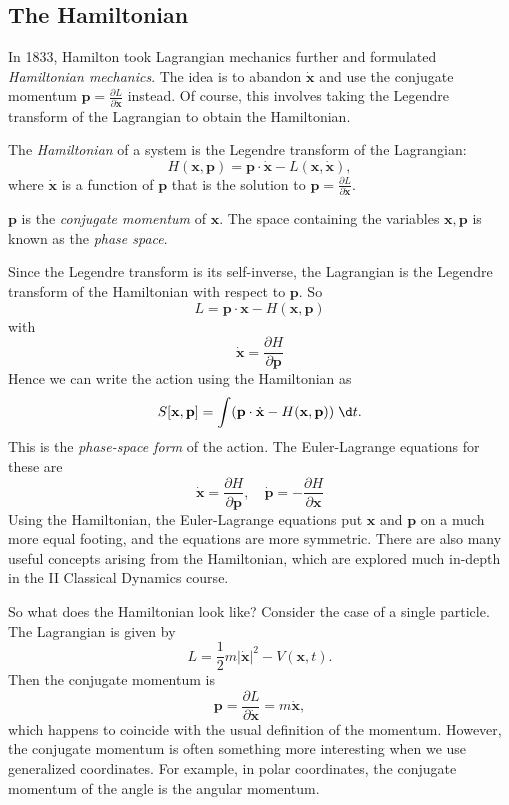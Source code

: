 \documentclass[a4paper]{article}
\begin{document}
\subsection{The Hamiltonian}
In 1833, Hamilton took Lagrangian mechanics further and formulated \emph{Hamiltonian mechanics}. The idea is to abandon $\dot{\mathbf{x}}$ and use the conjugate momentum $\mathbf{p} = \frac{\partial L}{\partial \dot{\mathbf{x}}}$ instead. Of course, this involves taking the Legendre transform of the Lagrangian to obtain the Hamiltonian.

\begin{defi}[Hamiltonian]
  The \emph{Hamiltonian} of a system is the Legendre transform of the Lagrangian:
  \[
    H(\mathbf{x}, \mathbf{p}) = \mathbf{p}\cdot \dot{\mathbf{x}} - L(\mathbf{x}, \dot{\mathbf{x}}),
  \]
  where $\dot{\mathbf{x}}$ is a function of $\mathbf{p}$ that is the solution to $\mathbf{p} = \frac{\partial L}{\partial \dot{\mathbf{x}}}$.

  $\mathbf{p}$ is the \emph{conjugate momentum} of $\mathbf{x}$. The space containing the variables $\mathbf{x}, \mathbf{p}$ is known as the \emph{phase space}.
\end{defi}

Since the Legendre transform is its self-inverse, the Lagrangian is the Legendre transform of the Hamiltonian with respect to $\mathbf{p}$. So
\[
  L = \mathbf{p}\cdot \mathbf{x} - H(\mathbf{x}, \mathbf{p})
\]
with
\[
  \dot{\mathbf{x}} = \frac{\partial H}{\partial \mathbf{p}}
\]
Hence we can write the action using the Hamiltonian as
\[
  S[\mathbf{x}, \mathbf{p}] = \int (\mathbf{p}\cdot \dot{\mathbf{x}} - H(\mathbf{x}, \mathbf{p}))\;\d t.
\]
This is the \emph{phase-space form} of the action. The Euler-Lagrange equations for these are
\[
  \dot{\mathbf{x}} = \frac{\partial H}{\partial \mathbf{p}}, \quad \dot{\mathbf{p}} = -\frac{\partial H}{\partial \mathbf{x}}
\]
Using the Hamiltonian, the Euler-Lagrange equations put $\mathbf{x}$ and $\mathbf{p}$ on a much more equal footing, and the equations are more symmetric. There are also many useful concepts arising from the Hamiltonian, which are explored much in-depth in the II Classical Dynamics course.

So what does the Hamiltonian look like? Consider the case of a single particle. The Lagrangian is given by
\[
  L = \frac{1}{2}m|\dot{\mathbf{x}}|^2 - V(\mathbf{x}, t).
\]
Then the conjugate momentum is
\[
  \mathbf{p} = \frac{\partial L}{\partial \dot{\mathbf{x}}} = m\dot{\mathbf{x}},
\]
which happens to coincide with the usual definition of the momentum. However, the conjugate momentum is often something more interesting when we use generalized coordinates. For example, in polar coordinates, the conjugate momentum of the angle is the angular momentum.
\end{document}
